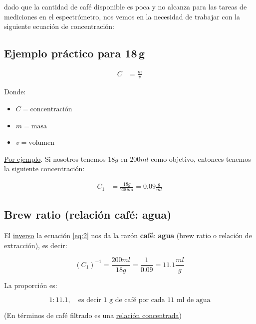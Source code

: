 \documentclass{article}
\begin{document}
dado que la cantidad de café disponible es poca y no alcanza para las tareas de mediciones en el espectrómetro, nos vemos en la necesidad de trabajar con la siguiente ecuación de concentración:

\subsection{Ejemplo práctico para 18\,g}

\begin{equation}
\begin{split}
C &= \frac{m}{v}
\end{split}
\end{equation}

Donde:

\begin{itemize}
\item[$\bullet$] $C = \text{concentración}$\\
\item[$\bullet$] $m = \text{masa}$\\
\item[$\bullet$] $v = \text{volumen}$
\end{itemize}

\underline{Por ejemplo}. Si nosotros tenemos $18g$ en $200ml$ como objetivo, entonces tenemos la siguiente concentración:

\begin{equation}
\begin{split}
 C_{1} &= \frac{18g}{200ml} = 0\text{.}09 \frac{g}{ml}
\end{split}\label{eq:2}
\end{equation}

\subsection{Brew ratio (relación café: agua)}

El \underline{inverso} la ecuación \ref{eq:2} nos da la razón \textcolor{Pesto}{\textbf{café}}: \textcolor{Cerulean}{\textbf{agua}} (brew ratio o relación de extracción), es decir:

\[ \left(C_{1}\right)^{-1} = \frac{  200ml }{ 18g } = \frac{1}{0\text{.}09} = 11\text{.}1 \frac{ml}{g}  \]

La proporción es:

\[\boxed{1:11\text{.}1}, \quad \text{es decir 1 g de café por cada 11 ml de agua}\]

(En términos de café filtrado es una \underline{relación concentrada})
\end{document}
